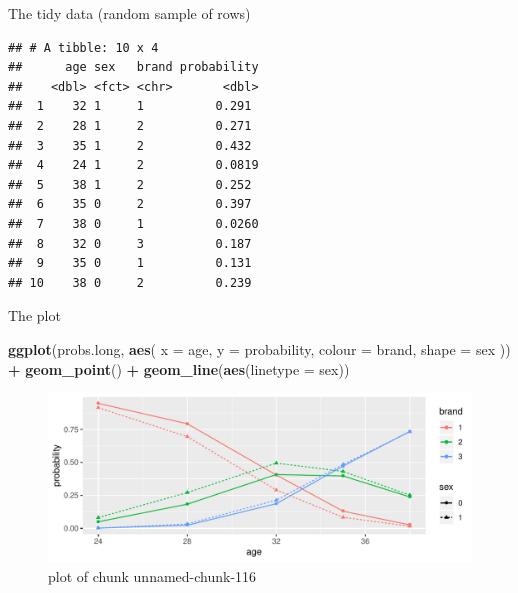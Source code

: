 \documentclass[ignorenonframetext,]{beamer}
\newenvironment{Shaded}{\begin{snugshade}}{\end{snugshade}}
\newcommand{\DataTypeTok}[1]{\textcolor[rgb]{0.13,0.29,0.53}{#1}}
\newcommand{\DecValTok}[1]{\textcolor[rgb]{0.00,0.00,0.81}{#1}}
\newcommand{\KeywordTok}[1]{\textcolor[rgb]{0.13,0.29,0.53}{\textbf{#1}}}
\newcommand{\NormalTok}[1]{#1}
\newcommand{\OperatorTok}[1]{\textcolor[rgb]{0.81,0.36,0.00}{\textbf{#1}}}
\newcommand{\StringTok}[1]{\textcolor[rgb]{0.31,0.60,0.02}{#1}}
\begin{document}
\begin{frame}[fragile]{The tidy data (random sample of rows)}
\protect\hypertarget{the-tidy-data-random-sample-of-rows}{}

\small

\begin{Shaded}
\end{Shaded}

\begin{verbatim}
## # A tibble: 10 x 4
##      age sex   brand probability
##    <dbl> <fct> <chr>       <dbl>
##  1    32 1     1          0.291 
##  2    28 1     2          0.271 
##  3    35 1     2          0.432 
##  4    24 1     2          0.0819
##  5    38 1     2          0.252 
##  6    35 0     2          0.397 
##  7    38 0     1          0.0260
##  8    32 0     3          0.187 
##  9    35 0     1          0.131 
## 10    38 0     2          0.239
\end{verbatim}

\normalsize

\end{frame}

\begin{frame}[fragile]{The plot}
\protect\hypertarget{the-plot-1}{}

\begin{Shaded}
\begin{Highlighting}[]
\KeywordTok{ggplot}\NormalTok{(probs.long, }\KeywordTok{aes}\NormalTok{(}
  \DataTypeTok{x =}\NormalTok{ age, }\DataTypeTok{y =}\NormalTok{ probability,}
  \DataTypeTok{colour =}\NormalTok{ brand, }\DataTypeTok{shape =}\NormalTok{ sex}
\NormalTok{)) }\OperatorTok{+}
\StringTok{  }\KeywordTok{geom_point}\NormalTok{() }\OperatorTok{+}\StringTok{ }\KeywordTok{geom_line}\NormalTok{(}\KeywordTok{aes}\NormalTok{(}\DataTypeTok{linetype =}\NormalTok{ sex))}
\end{Highlighting}
\end{Shaded}

\begin{figure}
\centering
\includegraphics{figure/unnamed-chunk-116-1.pdf}
\caption{plot of chunk unnamed-chunk-116}
\end{figure}

\end{frame}
\end{document}
